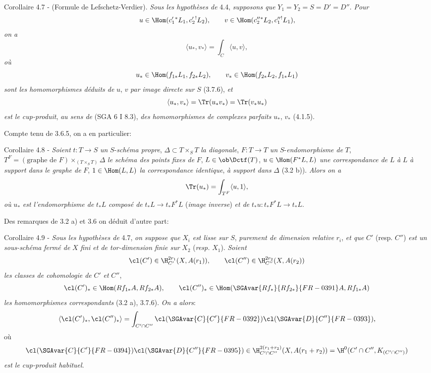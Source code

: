 \begin{statement}{Corollaire 4.7 - (Formule de Lefschetz-Verdier).}
\emph{Sous les hypothèses de} 4.4, \emph{supposons que} $Y_1=Y_2=S=D'=D''$. \emph{Pour}
\[
u\in\Hom(c_1'{}^*L_1,c_2'{}^!L_2),\qquad
v\in\Hom(c_2''{}^*L_2,c_1''{}^!L_1),
\]
\emph{on a}
\begin{equation}
\tag{4.7.1}
\langle u_*,v_*\rangle=\int_C\langle u,v\rangle,
\end{equation}
\emph{où}
\[
u_*\in\Hom(f_{1*}L_1,f_{2*}L_2),\qquad
v_*\in\Hom(f_{2*}L_2,f_{1*}L_1)
\]
\emph{sont les homomorphismes déduits de} $u$, $v$ \emph{par image directe sur} $S$ (3.7.6), \emph{et}
\[
\langle u_*,v_*\rangle=\Tr(u_*v_*)=\Tr(v_*u_*)
\]
\emph{est le cup-produit}, \emph{au sens de} (SGA 6 I 8.3), \emph{des homomorphismes de complexes parfaits} $u_*$, $v_*$ (4.1.5).
\end{statement}

Compte tenu de 3.6.5, on a en particulier:

\begin{statement}{Corollaire 4.8 -}
\emph{Soient} $t:T\longrightarrow S$ \emph{un} $S$-\emph{schéma propre}, $\Delta\subset T\times_S T$ \emph{la diagonale}, $F:T\longrightarrow T$ \emph{un} $S$-\emph{endomorphisme de} $T$, $T^F=(\text{graphe de }F)\times_{(T\times_S T)}\Delta$ \emph{le schéma des points fixes de} $F$, $L\in\ob\Dctf(T)$, $u\in\Hom(F^*L,L)$ \emph{une correspondance de} $L$ \emph{à} $L$ \emph{à support dans le graphe de} $F$, $1\in\Hom(L,L)$ \emph{la correspondance identique}, \emph{à support dans} $\Delta$ (3.2 b)). \emph{Alors on a}
\[
\Tr(u_*)=\int_{T^F}\langle u,1\rangle,
\]
\emph{où} $u_*$ \emph{est l'endomorphisme de} $t_*L$ \emph{composé de} $t_*L\longrightarrow t_*F^*L$ (\emph{image inverse}) \emph{et de} $t_*u:t_*F^*L\longrightarrow t_*L$.
\end{statement}

Des remarques de 3.2 a) et 3.6 on déduit d'autre part:

\begin{statement}{Corollaire 4.9 -}
\emph{Sous les hypothèses de} 4.7, \emph{on suppose que} $X_i$ \emph{est lisse sur} $S$, \emph{purement de dimension relative} $r_i$, \emph{et que} $C'$ (resp. $C''$) \emph{est un sous-schéma}
\emph{fermé de} $X$ \emph{fini et de tor-dimension finie sur} $X_2$ (\emph{resp.} $X_1$). \emph{Soient}
\[
\cl(C')\in \H_{C'}^{2r_1}(X,A(r_1)),\qquad
\cl(C'')\in \H_{C''}^{2r_2}(X,A(r_2))
\]
\emph{les classes de cohomologie de} $C'$ \emph{et} $C''$,
\[
\cl(C')_*\in\Hom(Rf_{1*}A,Rf_{2*}A),\qquad
\cl(C'')_*\in\Hom(\SGAvar{Rf_*}{Rf_{2*}}{FR-0391}A,Rf_{1*}A)
\]
\emph{les homomorphismes correspondants} (3.2 a), 3.7.6). \emph{On a alors}:
\[
\langle \cl(C')_*,\cl(C'')_*\rangle
=
\int_{C'\cap C''}\cl(\SGAvar{C}{C'}{FR-0392})\cl(\SGAvar{D}{C''}{FR-0393}),
\]
où
\[
\cl(\SGAvar{C}{C'}{FR-0394})\cl(\SGAvar{D}{C''}{FR-0395})\in
\H_{C'\cap C''}^{2(r_1+r_2)}(X,A(r_1+r_2))
=
\H^0(C'\cap C'',K_{(C'\cap C'')})
\]
\emph{est le cup-produit habituel}.
\end{statement}

